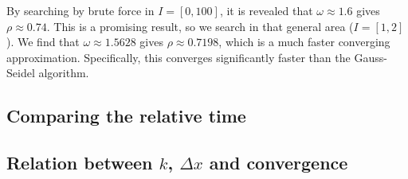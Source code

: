 \documentclass[12pt]{article}
\begin{document}
\begin{multicols}{2}
    By searching by brute force in $I = [0, 100]$,
    it is revealed that $\omega \approx 1.6$ gives $\rho \approx 0.74$.
    This is a promising result, so we search in that general area
    ($I = [1, 2]$). We find that $\omega \approx 1.5628$ gives
    $\rho \approx 0.7198$, which is a much faster converging
    approximation.
    Specifically, this converges significantly faster than the Gauss-Seidel algorithm.

    \subsection{Comparing the relative time}

    \subsection{Relation between $k$, $\Delta x$ and convergence}


\end{multicols}
\end{document}

